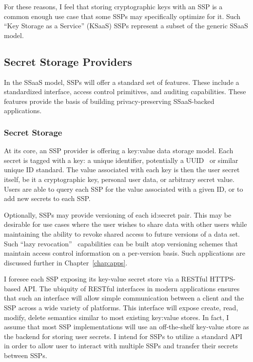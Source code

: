 For these reasons, I feel that storing cryptographic keys with an SSP
is a common enough use case that some SSPs may specifically optimize
for it. Such ``Key Storage as a Service'' (KSaaS) SSPs represent a
subset of the generic SSaaS model.

\subsection{Secret Storage Providers}

In the SSaaS model, SSPs will offer a standard set of features. These
include a standardized interface, access control primitives, and
auditing capabilities. These features provide the basis of building
privacy-preserving SSaaS-backed applications.

\subsubsection{Secret Storage}

At its core, an SSP provider is offering a key:value data storage
model. Each secret is tagged with a key: a unique identifier,
potentially a UUID~\cite{leach2005} or similar unique ID standard. The
value associated with each key is then the user secret itself, be it a
cryptographic key, personal user data, or arbitrary secret
value. Users are able to query each SSP for the value associated with
a given ID, or to add new secrets to each SSP.

Optionally, SSPs may provide versioning of each id:secret pair. This
may be desirable for use cases where the user wishes to share data
with other users while maintaining the ability to revoke shared access
to future versions of a data set. Such ``lazy
revocation''~\cite{kallahalla2003} capabilities can be built atop
versioning schemes that maintain access control information on a
per-version basis. Such applications are discussed further in
Chapter~\ref{chap:apps}.

I foresee each SSP exposing its key-value secret store via a RESTful
HTTPS-based API. The ubiquity of RESTful interfaces in modern
applications ensures that such an interface will allow simple
communication between a client and the SSP across a wide variety of
platforms. This interface will expose create, read, modify, delete
semantics similar to most existing key:value stores. In fact, I assume
that most SSP implementations will use an off-the-shelf key-value
store as the backend for storing user secrets. I intend for SSPs to
utilize a standard API in order to allow user to interact with
multiple SSPs and transfer their secrets between SSPs.

